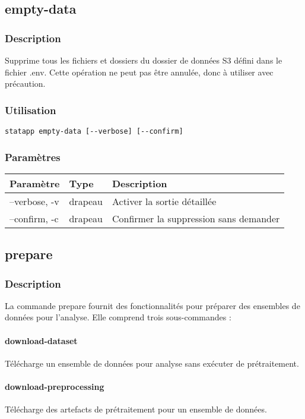 \documentclass{article}
\begin{document}
\subsection{empty-data}
\subsubsection{Description}
Supprime tous les fichiers et dossiers du dossier de données S3 défini dans le fichier .env. Cette opération ne peut pas être annulée, donc à utiliser avec précaution.

\subsubsection{Utilisation}
\begin{lstlisting}
statapp empty-data [--verbose] [--confirm]
\end{lstlisting}

\subsubsection{Paramètres}
\begin{tabulary}{\linewidth}{LLL}
\toprule
\textbf{Paramètre} & \textbf{Type} & \textbf{Description} \\
\midrule
--verbose, -v & drapeau & Activer la sortie détaillée \\
--confirm, -c & drapeau & Confirmer la suppression sans demander \\
\bottomrule
\end{tabulary}

\subsection{prepare}
\subsubsection{Description}
La commande prepare fournit des fonctionnalités pour préparer des ensembles de données pour l'analyse. Elle comprend trois sous-commandes :

\paragraph{download-dataset}
Télécharge un ensemble de données pour analyse sans exécuter de prétraitement.

\paragraph{download-preprocessing}
Télécharge des artefacts de prétraitement pour un ensemble de données.
\end{document}
